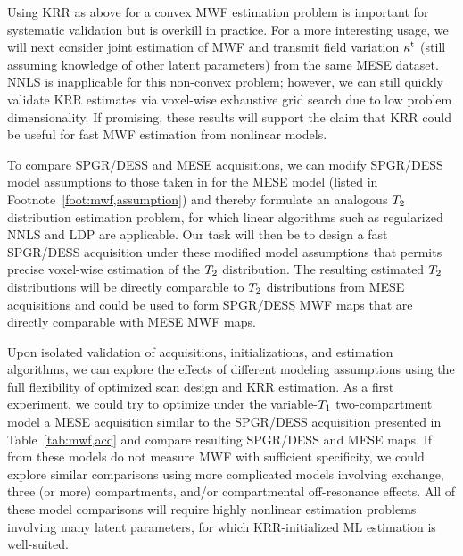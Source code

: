 Using KRR as above
for a convex MWF estimation problem 
is important for systematic validation
but is overkill in practice.
For a more interesting usage,
we will next consider joint estimation
of MWF and transmit field variation $\kappa^{\mathrm{t}}$
(still assuming knowledge of other latent parameters)
from the same MESE dataset.
NNLS is inapplicable 
for this non-convex problem;
however, 
we can still quickly validate KRR estimates 
via voxel-wise exhaustive grid search
due to low problem dimensionality.
If promising,
these results will support the claim
that KRR could be useful 
for fast \invivo MWF estimation 
from nonlinear models.

To compare SPGR/DESS and MESE acquisitions,
we can modify SPGR/DESS model assumptions
to those taken in \cite{prasloski:12:rwc}
for the MESE model
(listed in Footnote~\ref{foot:mwf,assumption})
and thereby formulate an analogous
$T_2$ distribution estimation problem,
for which linear algorithms 
such as regularized NNLS and LDP are applicable.
Our task will then be 
to design a fast SPGR/DESS acquisition
under these modified model assumptions
that permits precise voxel-wise estimation 
of the $T_2$ distribution.
The resulting estimated $T_2$ distributions
will be directly comparable 
to $T_2$ distributions 
from MESE acquisitions
and could be used
to form SPGR/DESS MWF maps
that are directly comparable 
with MESE MWF maps.

Upon isolated validation
of acquisitions, initializations, and estimation algorithms,
we can explore the effects 
of different modeling assumptions
using the full flexibility
of optimized scan design and KRR estimation.
As a first experiment,
we could try to optimize
under the variable-$T_1$ two-compartment model 
a MESE acquisition
similar to the SPGR/DESS acquisition 
presented in Table~\ref{tab:mwf,acq}
and compare resulting SPGR/DESS and MESE \ffest maps. 
If \ffest from these models do not measure MWF
with sufficient specificity,
we could explore similar comparisons
using more complicated models
involving exchange, three (or more) compartments,
and/or compartmental off-resonance effects.
All of these model comparisons 
will require highly nonlinear estimation problems
involving many latent parameters,
for which KRR-initialized ML estimation is well-suited.

